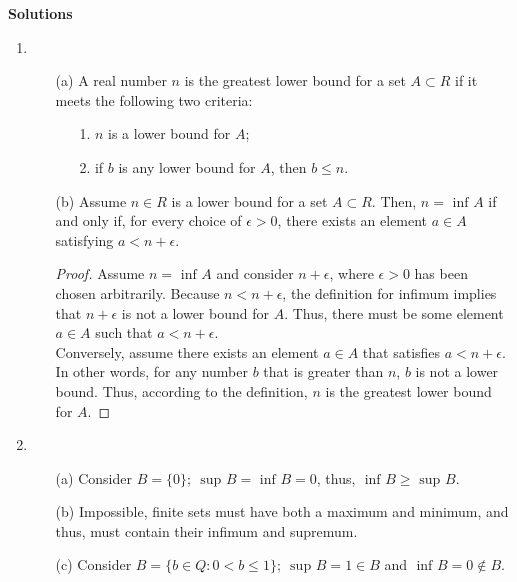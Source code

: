 \textbf{Solutions}\\
\begin{enumerate}
  \item 
    \begin{enumerate}
      \item[(a)] A real number $n$ is the greatest lower bound for a set $A \subset R$ if it meets the following two criteria:
        \begin{enumerate}
          \item[1.] $n$ is a lower bound for $A$;
          \item[2.] if $b$ is any lower bound for $A$, then $b \leq n$. 
        \end{enumerate}
      \item[(b)] Assume $n \in R$ is a lower bound for a set $A \subset R$. Then, $n = \text{ inf } A$ if and only if, for every choice of $\epsilon > 0$, there exists an element $a \in A$ satisfying $a < n + \epsilon$. \\

        \begin{proof}
          Assume $n = \text{ inf } A$ and consider $n + \epsilon$, where $\epsilon > 0$ has been chosen arbitrarily. Because $n < n + \epsilon$, the definition for infimum implies that $n + \epsilon$ is not a lower bound for $A$. Thus, there must be some element $a \in A$ such that $a < n + \epsilon$.\\
          Conversely, assume there exists an element $a \in A$ that satisfies $a < n + \epsilon$. In other words, for any number $b$ that is greater than $n$, $b$ is not a lower bound. Thus, according to the definition, $n$ is the greatest lower bound for $A$. 
        \end{proof}
    \end{enumerate}

  \item 
    \begin{enumerate}
      \item[(a)] Consider $B = \{0\}$; $\text{ sup } B = \text{ inf } B = 0$, thus, $\text{ inf }B \geq \text{ sup } B$.
      \item[(b)] Impossible, finite sets must have both a maximum and minimum, and thus, must contain their infimum and supremum.
      \item[(c)] Consider $B = \{b \in Q : 0 < b \leq 1\}$; $\text{ sup } B = 1 \in B$ and $\text{ inf } B = 0 \not\in B$.
    \end{enumerate}


\end{enumerate}

